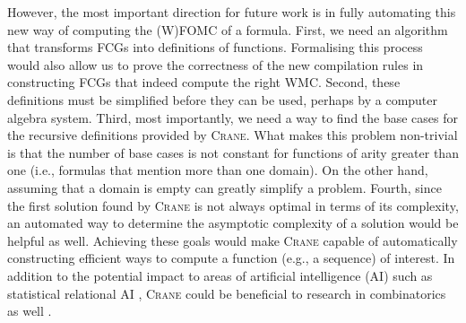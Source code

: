 \documentclass[letterpaper]{article} %
\theoremstyle{definition}
\theoremstyle{remark}
\begin{document}
However, the most important direction for future work is in fully automating
this new way of computing the (W)FOMC of a formula. First, we need an algorithm
that transforms FCGs into definitions of functions. Formalising this process
would also allow us to prove the correctness of the new compilation rules in
constructing FCGs that indeed compute the right WMC\@. Second, these definitions
must be simplified before they can be used, perhaps by a computer algebra
system. Third, most importantly, we need a way to find the base cases for the
recursive definitions provided by \textsc{Crane}. What makes this problem
non-trivial is that the number of base cases is not constant for functions of
arity greater than one (i.e., formulas that mention more than one domain). On
the other hand, assuming that a domain is empty can greatly simplify a problem.
Fourth, since the first solution found by \textsc{Crane} is not always optimal
in terms of its complexity, an automated way to determine the asymptotic
complexity of a solution would be helpful as well. Achieving these goals would
make \textsc{Crane} capable of automatically constructing efficient ways to
compute a function (e.g., a sequence) of interest. In addition to the potential
impact to areas of artificial intelligence (AI) such as statistical relational
AI \citep{DBLP:series/synthesis/2016Raedt}, \textsc{Crane} could be beneficial
to research in combinatorics as well \citep{DBLP:conf/ilp/BarvinekB0ZK21}.


\end{document}
